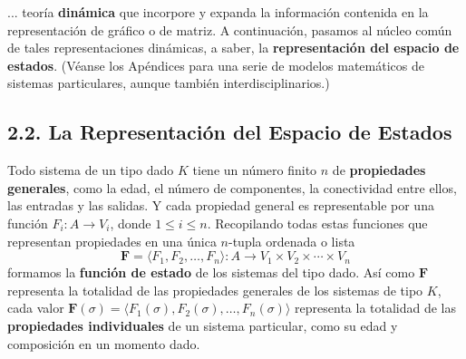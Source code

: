 {\fontsize{13}{15}\selectfont
... teoría \textbf{dinámica} que incorpore y expanda la información contenida en la representación de gráfico o de matriz. A continuación, pasamos al núcleo común de tales representaciones dinámicas, a saber, la \textbf{representación del espacio de estados}. (Véanse los Apéndices para una serie de modelos matemáticos de sistemas particulares, aunque también interdisciplinarios.)

\subsection*{2.2. La Representación del Espacio de Estados}
Todo sistema de un tipo dado $K$ tiene un número finito $n$ de \textbf{propiedades generales}, como la edad, el número de componentes, la conectividad entre ellos, las entradas y las salidas. Y cada propiedad general es representable por una función $F_i: A \rightarrow V_i$, donde $1 \le i \le n$. Recopilando todas estas funciones que representan propiedades en una única $n$-tupla ordenada o lista
$$ \mathbf{F} = \langle F_1, F_2, \ldots, F_n \rangle : A \longrightarrow V_1 \times V_2 \times \cdots \times V_n $$
formamos la \textbf{función de estado} de los sistemas del tipo dado. Así como $\mathbf{F}$ representa la totalidad de las propiedades generales de los sistemas de tipo $K$, cada valor $\mathbf{F}(\sigma) = \langle F_1(\sigma), F_2(\sigma), \ldots, F_n(\sigma) \rangle$ representa la totalidad de las \textbf{propiedades individuales} de un sistema particular, como su edad y composición en un momento dado.

}
